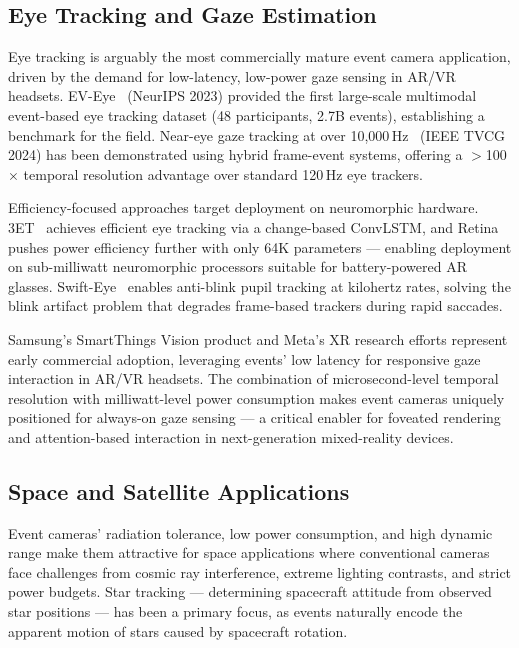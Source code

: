 \subsection{Eye Tracking and Gaze Estimation}
\label{sec:appl_eye}

Eye tracking is arguably the most commercially mature event camera application, driven by the demand for low-latency, low-power gaze sensing in AR/VR headsets. EV-Eye~\cite{chen2023eveye} (NeurIPS 2023) provided the first large-scale multimodal event-based eye tracking dataset (48 participants, 2.7B events), establishing a benchmark for the field. Near-eye gaze tracking at over 10{,}000\,Hz~\cite{stoffregen2024tvcggaze} (IEEE TVCG 2024) has been demonstrated using hybrid frame-event systems, offering a $>$100$\times$ temporal resolution advantage over standard 120\,Hz eye trackers.

Efficiency-focused approaches target deployment on neuromorphic hardware. 3ET~\cite{chen20233et} achieves efficient eye tracking via a change-based ConvLSTM, and Retina~\cite{li2024retina} pushes power efficiency further with only 64K parameters --- enabling deployment on sub-milliwatt neuromorphic processors suitable for battery-powered AR glasses. Swift-Eye~\cite{wang2024swifteye} enables anti-blink pupil tracking at kilohertz rates, solving the blink artifact problem that degrades frame-based trackers during rapid saccades.

Samsung's SmartThings Vision product and Meta's XR research efforts represent early commercial adoption, leveraging events' low latency for responsive gaze interaction in AR/VR headsets. The combination of microsecond-level temporal resolution with milliwatt-level power consumption makes event cameras uniquely positioned for always-on gaze sensing --- a critical enabler for foveated rendering and attention-based interaction in next-generation mixed-reality devices.


\subsection{Space and Satellite Applications}
\label{sec:appl_space}

Event cameras' radiation tolerance, low power consumption, and high dynamic range make them attractive for space applications where conventional cameras face challenges from cosmic ray interference, extreme lighting contrasts, and strict power budgets. Star tracking --- determining spacecraft attitude from observed star positions --- has been a primary focus, as events naturally encode the apparent motion of stars caused by spacecraft rotation.

